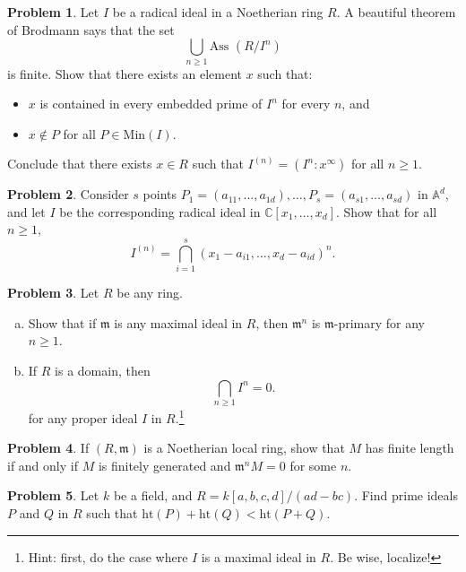 \documentclass[11pt]{article}
\theoremstyle{definition}
\newtheorem{problem}{Problem}
\begin{document}
\begin{problem}
	Let $I$ be a radical ideal in a Noetherian ring $R$. A beautiful theorem of Brodmann says that the set
	$$\bigcup_{n \geqslant 1} \textrm{Ass } (R/I^n)$$
	is finite. Show that there exists an element $x$ such that:
	\begin{itemize}
		\item $x$ is contained in every embedded prime of $I^n$ for every $n$, and
		\item $x \notin P$ for all $P \in \textrm{Min}(I)$.
	\end{itemize}
	Conclude that there exists $x \in R$ such that $I^{(n)} = (I^n : x^\infty)$ for all $n \geqslant 1$.
\end{problem}



\begin{problem}
	Consider $s$ points $P_1 = (a_{11}, \ldots, a_{1d}), \ldots, P_s = (a_{s1}, \ldots, a_{sd})$ in $\mathbb{A}^d$, and let $I$ be the corresponding radical ideal in $\mathbb{C}[x_1, \ldots, x_d]$. Show that for all $n \geqslant 1$,
	$$I^{(n)} = \bigcap_{i=1}^s (x_1 - a_{i1}, \ldots, x_d - a_{id})^n.$$
\end{problem}

\begin{problem} 
Let $R$ be any ring.
\begin{enumerate}[a)]
	\item Show that if $\mathfrak{m}$ is any maximal ideal in $R$, then $\mathfrak{m}^n$ is $\mathfrak{m}$-primary for any $n \geqslant 1$.
	\item If $R$ is a domain, then
	$$\bigcap_{n \geqslant 1} I^n = 0.$$
	for any proper ideal $I$ in $R$.\footnote{Hint: first, do the case where $I$ is a maximal ideal in $R$. Be wise, localize!}
\end{enumerate}
\end{problem}


\begin{problem}
If $(R, \mathfrak{m})$ is a Noetherian local ring, show that $M$ has finite length if and only if $M$ is finitely generated and $\mathfrak{m}^n M = 0$ for some $n$.
\end{problem}
	
	
\begin{problem}
	Let $k$ be a field, and $R = k[a,b,c,d]/(ad-bc)$. Find prime ideals $P$ and $Q$ in $R$ such that $\textrm{ht}(P) + \textrm{ht}(Q) < \textrm{ht}(P + Q)$.
\end{problem}
\end{document}
